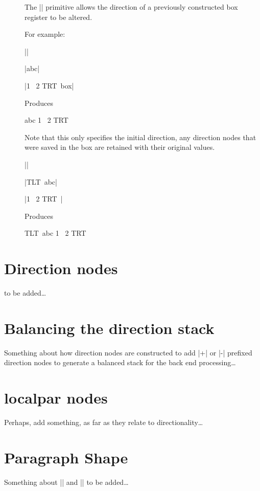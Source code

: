 \begin{description}

\item []

The |\boxdir| primitive allows the direction of a previously
constructed box register to be altered.

For example:

|\newbox\bxA|\par
|\setbox\bxA\hbox{abc}|\par
|1 \box\bxA\ 2 \boxdir\bxA TRT\ box\bxA|

Produces

\newbox\bxA
\setbox\bxA\hbox{abc}
1 \copy\bxA\ 2 \boxdir\bxA TRT\ \copy\bxA

Note that this only specifies the initial direction, any direction
nodes that were saved in the box are retained with their original values.

|\newbox\bxB|\par
|\setbox\bxB\hbox{\textdir TLT abc}|\par
|1 \copy\bxB\ 2 \boxdir\bxB TRT\ \copy\bxB|

Produces

\newbox\bxB
\setbox\bxB\hbox{\textdir TLT abc}
1 \copy\bxB\ 2 \boxdir\bxB TRT\ \copy\bxB

\end{description}

\section{Direction nodes}

to be added\dots

\section{Balancing the direction stack}

Something about how direction nodes are constructed to add |+| or |-|
prefixed direction nodes to generate a balanced stack for the back end
processing\dots


\section{ local\textunderscore par nodes}

Perhaps, add something, as far as they relate to directionality\dots

\section{Paragraph Shape}

Something about |\parshape| and |\shapemode| to be added\dots
